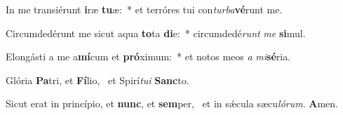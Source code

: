 \item In me transiérunt \textbf{i}ræ \textbf{tu}æ:~* et terróres tui con\textit{tur}\textit{ba}\textbf{vé}runt me.
\item Circumdedérunt me sicut aqua \textbf{to}ta \textbf{di}e:~* circumdedé\textit{runt} \textit{me} \textbf{si}mul.
\item Elongásti a me a\textbf{mí}cum et \textbf{pró}ximum:~* et notos meos \textit{a} \textit{mi}\textbf{sé}ria.
\item Glória \textbf{Pa}tri, et \textbf{Fí}lio,~\psstar{} et Spirí\textit{tu}\textit{i} \textbf{Sanc}to.
\item Sicut erat in princípio, et \textbf{nunc}, et \textbf{sem}per,~\psstar{} et in sǽcula sæcu\textit{ló}\textit{rum}. \textbf{A}men.